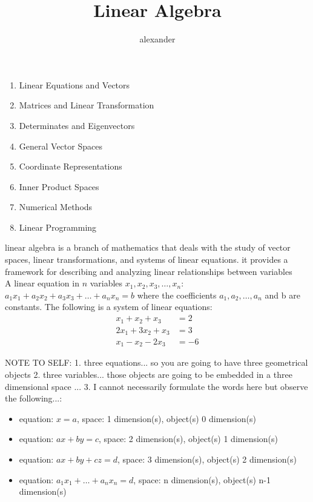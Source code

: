 \documentclass{article}
\begin{document}
\title{Linear Algebra}
\author{alexander}
\maketitle

\begin{enumerate}
	\item Linear Equations and Vectors
	\item Matrices and Linear Transformation
	\item Determinates and Eigenvectors
	\item General Vector Spaces
	\item Coordinate Representations
	\item Inner Product Spaces
	\item Numerical Methods
	\item Linear Programming
\end{enumerate}

linear algebra is a branch of mathematics that deals with the study of vector spaces, linear transformations, and systems of linear equations. it provides a framework for describing and analyzing linear relationships between variables\\

	A linear equation in $n$ variables $x_1,x_2,x_3,\ldots,x_n$: $a_1x_1 + a_2x_2 + a_3x_3 + \ldots + a_nx_n = b$ where the coefficients $a_1,a_2,\ldots,a_n$ and b are constants. The following is a system of linear equations: 	
	\begin{align*}
		x_1 + x_2 + x_3 &= 2\\
		2x_1 +3x_2 + x_3 &= 3\\
		x_1 - x_2 - 2x_3 &= -6	
	\end{align*}	

	NOTE TO SELF: 1. three equations... so you are going to have three geometrical objects 2. three variables... those objects are going to be embedded in a three dimensional space ... 3. I cannot necessarily formulate the words here but observe the following...:
		\begin{itemize}
			\item equation: $x = a$, space: 1 dimension(s), object(s) 0 dimension(s)
			\item equation: $ax + by = c$, space: 2 dimension(s), object(s) 1 dimension(s) 
			\item equation: $ax + by + cz = d$, space: 3 dimension(s), object(s) 2 dimension(s) 
			\item equation: $a_1x_1 + \ldots + a_nx_n = d$, space: n dimension(s), object(s) n-1 dimension(s) 
		\end{itemize}
\end{document}
